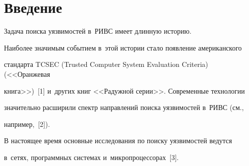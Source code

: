   























      \thispagestyle{headings}


      


                        \vspace*{-16pt}


     


\section{Введение}





\vspace*{-4pt}





  Задача поиска уязвимостей в~РИВС имеет длинную историю. 


Наиболее значимым событием в~этой истории стало появление американского 


стандарта TCSEC (Trusted Computer System Evaluation Criteria) (<<Оранжевая 


книга>>)~[1] и~других книг <<Радужной серии>>. Современные технологии 


значительно расширили спектр направлений поиска уязвимостей в~РИВС (см., 


например,~[2]). 


  


  В настоящее время основные исследования по поиску уязвимостей ведутся 


в~сетях, программных системах и~микропроцессорах~[3].








